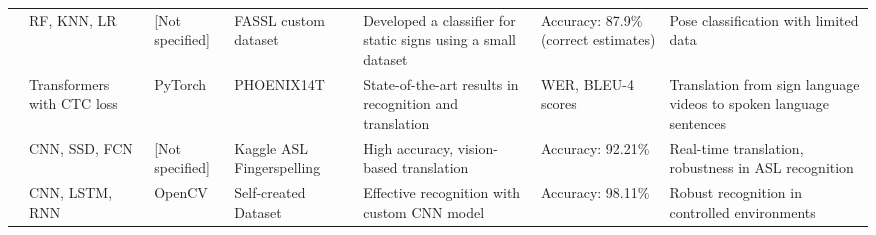 \begin{longtable}{p{}p{}p{}p{}p{}p{}p{}}
    \cite{weerasooriyaSinhalaFingerspellingSign2022}   & RF, KNN, LR                                                                                                           & [Not specified]          & FASSL custom dataset           & Developed a classifier for static signs using a small dataset                                                                                             & Accuracy: 87.9\% (correct estimates)                   & Pose classification with limited data                                                                                                                                   \\

    \cite{cihancamgozSignLanguageTransformers2020}     & Transformers with CTC loss                                                                                            & PyTorch                  & PHOENIX14T                     & State-of-the-art results in recognition and translation                                                                                                   & WER, BLEU-4 scores                                     & Translation from sign language videos to spoken language sentences                                                                                                      \\

    \cite{abiyevReconstructionConvolutionalNeural2020} & CNN, SSD, FCN                                                                                                         & [Not specified]          & Kaggle ASL Fingerspelling      & High accuracy, vision-based translation                                                                                                                   & Accuracy: 92.21\%                                      & Real-time translation, robustness in ASL recognition                                                                                                                    \\

    \cite{bantupalliAmericanSignLanguage2018}          & CNN, LSTM, RNN                                                                                                        & OpenCV                   & Self-created Dataset           & Effective recognition with custom CNN model                                                                                                               & Accuracy: 98.11\%                                      & Robust recognition in controlled environments                                                                                                                           \\


\end{longtable}
